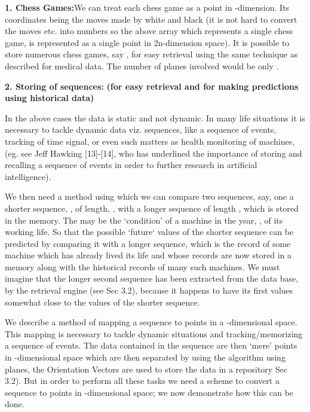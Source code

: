 \documentclass[english]{article}
\begin{document}
\textbf{\large 1. Chess Games:}We can treat each chess game as a point
in -dimension. Its coordinates being 
the  moves made by white and black (it is not hard to convert
the moves  etc. into numbers so the above array which represents
a single chess game, is represented as a single point in 2n-dimension
space). It is possible to store numerous chess games, say , for
easy retrieval using the same technique as described for medical data.
The number of planes involved would be only . 

\medskip{}


\textbf{\large 2. Storing of sequences:}\textbf{ (for easy retrieval
and for making predictions using historical data)}

In the above cases the data is static and not dynamic. In many life
situations it is necessary to tackle dynamic data viz. sequences,
like a sequence of events, tracking of time signal, or even such matters
as health monitoring of machines, (eg. see Jeff Hawking {[}13{]}-{[}14{]},
who has underlined the importance of storing and recalling a sequence
of events in order to further research in artificial intelligence).

\medskip{}


We then need a method using which we can compare two sequences, say,
one a shorter sequence, ,
of length, , with a longer sequence 
of length , which is stored in the memory. The  may be
the `condition\textquoteright{} of a machine in the year, , of
its working life. So that the possible `future` values of the shorter
sequence can be predicted by comparing it with a longer sequence,
which is the record of some machine which has already lived its life
and whose records are now stored in a memory along with the historical
records of many such machines. We must imagine that the longer second
sequence has been extracted from the data base, by the retrieval engine
(see Sec 3.2), because it happens to have its first  values somewhat
close to the  values of the shorter sequence. 

\medskip{}


We describe a method of mapping a sequence to points in a -dimensional
space. This mapping is necessary to tackle dynamic situations and
tracking/memorizing a sequence of events. The data contained in the
sequence are then `mere\textquoteright{} points in -dimensional
space which are then separated by using the algorithm using  planes,
the Orientation Vectors are used to store the data in a repository
Sec 3.2). But in order to perform all these tasks we need a scheme
to convert a sequence to points in -dimensional space; we now
demonstrate how this can be done. 
\end{document}
